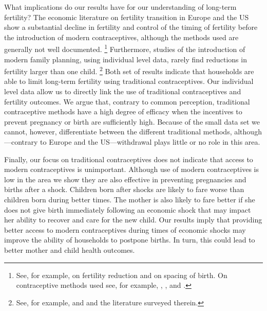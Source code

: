 \documentclass[letterpaper,12pt]{article}
\begin{document}
What implications do our results have for our understanding 
of long-term fertility?
The economic literature on fertility transition in Europe and the US 
show a substantial decline in fertility and control of the timing of 
fertility before the introduction of modern contraceptives, although 
the methods used are generally not well documented.%
\footnote{
See, for example, \citet{Guinnane2011} on fertility reduction and 
\citet{Cinnirella2017} on spacing of birth.
On contraceptive methods used see, for example, \citet{Michael1976},
\citet{David1986}, and \citet{Santow1995}.
}
Furthermore, studies of the introduction of modern family planning, 
using individual level data, rarely find reductions in fertility larger 
than one child.%
\footnote{
See, for example, \citet{Portner2014a} 
and \citet{Portner2018} and the literature surveyed therein.
}
Both set of results indicate that households are able to 
limit long-term fertility using traditional contraceptives.
Our individual level data allow us to directly link the use of
traditional contraceptives and fertility outcomes.
We argue that, contrary to common perception, traditional
contraceptive methods have a high degree of efficacy when the
incentives to prevent pregnancy or birth are sufficiently high.
Because of the small data set we cannot, however, differentiate between
the different traditional methods, although---contrary to Europe 
and the US---withdrawal plays little or no role in this area.

Finally, our focus on traditional contraceptives does
not indicate that access to modern contraceptives is unimportant.
Although use of modern contraceptives is low in the area we show
they are also effective in preventing pregnancies and births after a shock.
Children born after shocks are likely to fare worse than children born 
during better times.
The mother is also likely to fare better if she does not give birth 
immediately following an economic shock that may impact her ability 
to recover and care for the new child.
Our results imply that providing better access to modern contraceptives 
during times of economic shocks may improve the ability of households 
to postpone births.
In turn, this could lead to better mother and child health outcomes.



% 




\end{document}
